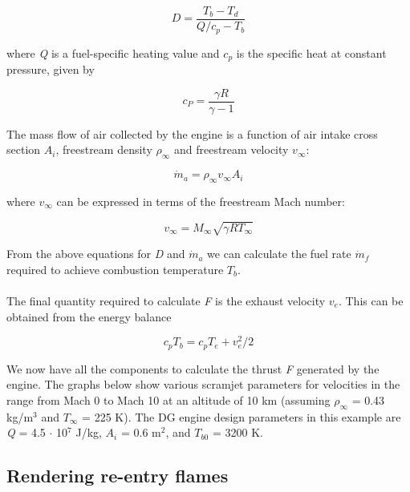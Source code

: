 \documentclass[Orbiter Developer Manual.tex]{subfiles}
\begin{document}
\[ D = \frac{T_{b} - T_{d}}{Q / c_{p} - T_{b}} \]

\noindent
where \textit{Q} is a fuel-specific heating value and $c_{p}$ is the specific heat at constant pressure, given by

\[ c_{P} = \frac{\gamma R}{\gamma - 1} \]

\noindent
The mass flow of air collected by the engine is a function of air intake cross section $A_{i}$, freestream density $\rho_{\infty}$ and freestream velocity $v_{\infty}$:

\[ \dot{m}_{a} = \rho_{\infty} v_{\infty} A_{i} \]

\noindent
where $v_{\infty}$ can be expressed in terms of the freestream Mach number:

\[ v_{\infty} = M_{\infty} \sqrt{\gamma R T_{\infty}} \]

\noindent
From the above equations for \textit{D} and $\dot{m}_{a}$ we can calculate the fuel rate $\dot{m}_{f}$ required to achieve combustion temperature $T_{b}$.\\
\\
The final quantity required to calculate \textit{F} is the exhaust velocity $v_{e}$. This can be obtained from the energy balance

\[ c_{p} T_{b} = c_{p} T_{e} + v^{2}_{e} / 2 \]

\noindent
We now have all the components to calculate the thrust \textit{F} generated by the engine. The graphs below show various scramjet parameters for velocities in the range from Mach 0 to Mach 10 at an altitude of 10 km (assuming $\rho_{\infty}$ = 0.43 kg/m$^{3}$ and $T_{\infty}$ = 225 K). The DG engine design parameters in this example are \textit{Q} = 4.5 $\cdot$ 10$^{7}$ J/kg, $A_{i}$ = 0.6 m$^{2}$, and $T_{b0}$ = 3200 K.

\begin{figure}[H]
	\centering
\end{figure}

\noindent

\subsection{Rendering re-entry flames}
\end{document}
